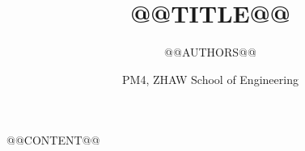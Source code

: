 \documentclass[11pt,a4paper]{article}
\title{\textbf{@@TITLE@@}}
\author{@@AUTHORS@@}
\date{PM4, ZHAW School of Engineering}
\begin{document}
\maketitle
\thispagestyle{fancy}

@@CONTENT@@
\end{document}
